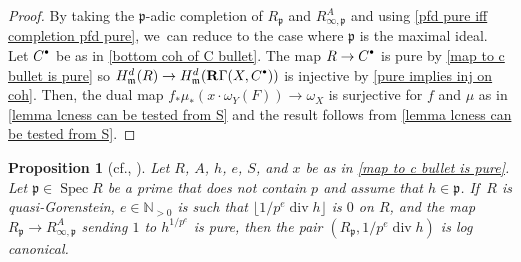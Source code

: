 \documentclass[11pt]{article}
\newcommand{\cf}{cf.\xspace}
\let\autoref\cref
\newcommand{\sbullet}{{\scriptscriptstyle\bullet}}
\newcommand{\csbullet}{{\raisebox{1pt}{$\sbullet$}}}
\theoremstyle{plain}
\newtheorem{proposition}[theorem]{Proposition}
\theoremstyle{definition}
\numberwithin{equation}{theorem}
\newcommand{\N}{\mathbb {N}}
\newcommand{\fram}{\mathfrak{m}}
\newcommand{\p}{\mathfrak{p}}
\DeclareMathOperator{\Div}{{div}}
\DeclareMathOperator{\Spec}{{Spec}}
\newcommand{\unpe}{{1/{p^e}}}
\newcommand{\rgamma}{\mathbf{R}\Gamma}
\begin{document}
\begin{proof}
By taking the $\p$-adic completion of $R_\p$ and $R^A_{\infty,\p}$ and using \autoref{pfd pure iff completion pfd pure}, we~can reduce to the case where $\p$ is the maximal ideal.
Let $C^\csbullet$ be as in \autoref{bottom coh of C bullet}.
The map $R\to C^\csbullet$ is pure by \autoref{map to c bullet is pure} so $H_\fram^d(R)\to H_\fram^d(\rgamma(X,C^\csbullet))$ is injective by \autoref{pure implies inj on coh}.
Then,
the dual map $f_* \mu_*(x\cdot \omega_Y(F))\to \omega_X$ is surjective for $f$ and $\mu$ as in \autoref{lemma lcness can be tested from S} and the result follows from \autoref{lemma lcness can be tested from S}.
\end{proof}

\begin{proposition}[{\cf \cite[Prop.\,5.4]{BMPSTWWPerfectoidPure}, \cite{KovacsSchwedeSmithLCImpliesDuBois}}]\label{lc implies log canonical}
Let $R$, $A$, $h$, $e$, $S$, and $x$ be as in \autoref{map to c bullet is pure}. Let $\p\in \Spec R$ be a prime that does not contain $p$ and assume that $h\in \p$. If~$R$ is quasi-Gorenstein, $e\in \N_{>0}$ is such that $\lfloor \unpe\Div h \rfloor$ is $0$ on $R$, and
the map $R_\p\to R^A_{\infty,\p}$ sending $1$ to $h^\unpe$ is pure, then the pair $(R_\p,\unpe \Div h)$ is log canonical.
\end{proposition}
\end{document}
